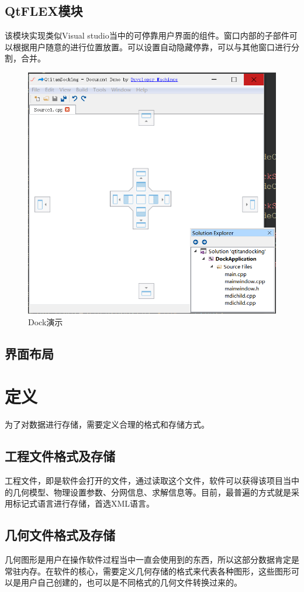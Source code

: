 \subsection{QtFLEX模块}
该模块实现类似Visual studio当中的可停靠用户界面的组件。窗口内部的子部件可以根据用户随意的进行位置放置。可以设置自动隐藏停靠，可以与其他窗口进行分割，合并。
\begin{figure}
	\centering
	\includegraphics[width=0.7\linewidth]{figures/dock}
	\caption{Dock演示}
	\label{fig:dock}
\end{figure}

\subsection{界面布局}

\section{定义}
为了对数据进行存储，需要定义合理的格式和存储方式。
\subsection{工程文件格式及存储}
工程文件，即是软件会打开的文件，通过读取这个文件，软件可以获得该项目当中的几何模型、物理设置参数、分网信息、求解信息等。目前，最普遍的方式就是采用标记式语言进行存储，首选XML语言。
\subsection{几何文件格式及存储}
几何图形是用户在操作软件过程当中一直会使用到的东西，所以这部分数据肯定是常驻内存。在软件的核心，需要定义几何存储的格式来代表各种图形，这些图形可以是用户自己创建的，也可以是不同格式的几何文件转换过来的。
